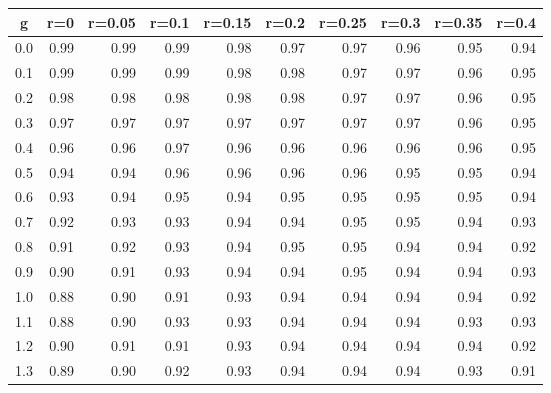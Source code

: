 %
\begin{table}[!tbp]
 \begin{center}
 \begin{tabular}{rrrrrrrrrr}\hline\hline
\multicolumn{1}{c}{g}&\multicolumn{1}{c}{r=0}&\multicolumn{1}{c}{r=0.05}&\multicolumn{1}{c}{r=0.1}&\multicolumn{1}{c}{r=0.15}&\multicolumn{1}{c}{r=0.2}&\multicolumn{1}{c}{r=0.25}&\multicolumn{1}{c}{r=0.3}&\multicolumn{1}{c}{r=0.35}&\multicolumn{1}{c}{r=0.4}\tabularnewline
\hline
0.0&0.99&0.99&0.99&0.98&0.97&0.97&0.96&0.95&0.94\tabularnewline
0.1&0.99&0.99&0.99&0.98&0.98&0.97&0.97&0.96&0.95\tabularnewline
0.2&0.98&0.98&0.98&0.98&0.98&0.97&0.97&0.96&0.95\tabularnewline
0.3&0.97&0.97&0.97&0.97&0.97&0.97&0.97&0.96&0.95\tabularnewline
0.4&0.96&0.96&0.97&0.96&0.96&0.96&0.96&0.96&0.95\tabularnewline
0.5&0.94&0.94&0.96&0.96&0.96&0.96&0.95&0.95&0.94\tabularnewline
0.6&0.93&0.94&0.95&0.94&0.95&0.95&0.95&0.95&0.94\tabularnewline
0.7&0.92&0.93&0.93&0.94&0.94&0.95&0.95&0.94&0.93\tabularnewline
0.8&0.91&0.92&0.93&0.94&0.95&0.95&0.94&0.94&0.92\tabularnewline
0.9&0.90&0.91&0.93&0.94&0.94&0.95&0.94&0.94&0.93\tabularnewline
1.0&0.88&0.90&0.91&0.93&0.94&0.94&0.94&0.94&0.92\tabularnewline
1.1&0.88&0.90&0.93&0.93&0.94&0.94&0.94&0.93&0.93\tabularnewline
1.2&0.90&0.91&0.91&0.93&0.94&0.94&0.94&0.94&0.92\tabularnewline
1.3&0.89&0.90&0.92&0.93&0.94&0.94&0.94&0.93&0.91\tabularnewline
\hline
\end{tabular}

\end{center}

\end{table}

